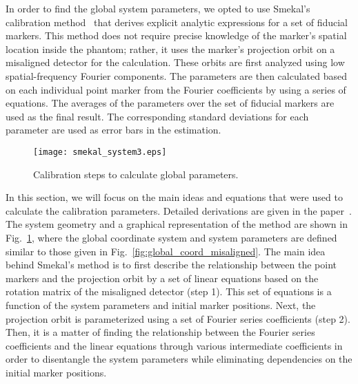In order to find the global system parameters, we opted to use Smekal's calibration method~\citep{Smekal2004} that derives explicit analytic expressions for a set of fiducial markers.  This method does not require precise knowledge of the marker's spatial location inside the phantom; rather, it uses the marker's projection orbit on a misaligned detector for the calculation.  These orbits are first analyzed using low spatial-frequency Fourier components.  The parameters are then calculated based on each individual point marker from the Fourier coefficients by using a series of equations.  The averages of the parameters over the set of fiducial markers are used as the final result.  The corresponding standard deviations for each parameter are used as error bars in the estimation.
%
\begin{figure}[ht]
\texttt{[image: smekal\_system3.eps]}
\caption{Calibration steps to calculate global parameters.}
\label{fig:smekal_method}
\end{figure}

In this section, we will focus on the main ideas and equations that were used to calculate the calibration parameters.  Detailed derivations are given in the paper~\citep{Smekal2004}.  The system geometry and a graphical representation of the method are shown in Fig.~\ref{fig:smekal_method}, where the global coordinate system and system parameters are defined similar to those given in Fig.~\ref{fig:global_coord_misaligned}. The main idea behind Smekal's method is to first describe the relationship between the point markers and the projection orbit by a set of linear equations based on the rotation matrix of the misaligned detector (step 1). This set of equations is a function of the system parameters and initial marker positions.  Next, the projection orbit is parameterized using a set of Fourier series coefficients (step 2).  Then, it is a matter of finding the relationship between the Fourier series coefficients and the linear equations through various intermediate coefficients in order to disentangle the system parameters while eliminating dependencies on the initial marker positions.

